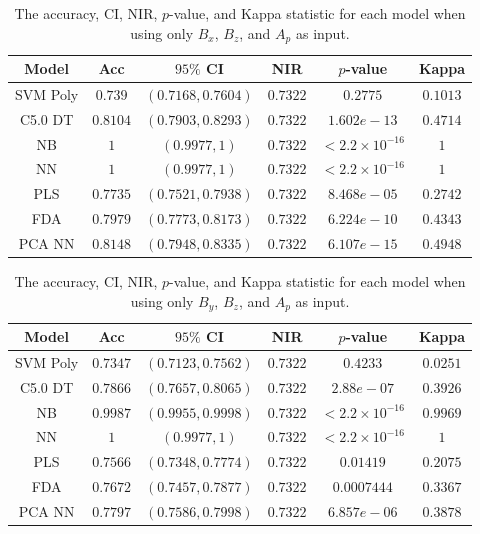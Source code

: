 \documentclass[sn-mathphys-num]{sn-jnl}%
\begin{document}
\begin{table}[!ht]
    \centering
    \caption{The accuracy, CI, NIR, $p$-value, and Kappa statistic for each model when using only $B_{x}$, $B_{z}$, and $A_{p}$ as input.}
	\label{tab:stats:reverse:xzap}
	\begin{tabular}{|c|c|c|c|c|c|}
		\hline
		Model & Acc & $95\%$ CI & NIR & $p$-value & Kappa \\ \hline
		SVM Poly & $0.739$ & $(0.7168, 0.7604)$ & $0.7322$ & $0.2775$ & $0.1013$ \\ \hline
		C5.0 DT & $0.8104$ & $(0.7903, 0.8293)$ & $0.7322$ & $1.602e-13$ & $0.4714$ \\ \hline
		NB & $1$ & $(0.9977, 1)$ & $0.7322$ & $< 2.2 \times {10}^{-16}$ & $1$ \\ \hline
		NN & $1$ & $(0.9977, 1)$ & $0.7322$ & $< 2.2 \times {10}^{-16}$ & $1$ \\ \hline
		PLS & $0.7735$ & $(0.7521, 0.7938)$ & $0.7322$ & $8.468e-05$ & $0.2742$ \\ \hline
		FDA & $0.7979$ & $(0.7773, 0.8173)$ & $0.7322$ & $6.224e-10$ & $0.4343$ \\ \hline
		PCA NN & $0.8148$ & $(0.7948, 0.8335)$ & $0.7322$ & $6.107e-15$ & $0.4948$ \\ \hline
	\end{tabular}
\end{table}

\begin{table}[!ht]
    \centering
    \caption{The accuracy, CI, NIR, $p$-value, and Kappa statistic for each model when using only $B_{y}$, $B_{z}$, and $A_{p}$ as input.}
	\label{tab:stats:reverse:yzap}
	\begin{tabular}{|c|c|c|c|c|c|}
		\hline
		Model & Acc & $95\%$ CI & NIR & $p$-value & Kappa \\ \hline
		SVM Poly & $0.7347$ & $(0.7123, 0.7562)$ & $0.7322$ & $0.4233$ & $0.0251$ \\ \hline
		C5.0 DT & $0.7866$ & $(0.7657, 0.8065)$ & $0.7322$ & $2.88e-07$ & $0.3926$ \\ \hline
		NB & $0.9987$ & $(0.9955, 0.9998)$ & $0.7322$ & $< 2.2 \times {10}^{-16}$ & $0.9969$ \\ \hline
		NN & $1$ & $(0.9977, 1)$ & $0.7322$ & $< 2.2 \times {10}^{-16}$ & $1$ \\ \hline
		PLS & $0.7566$ & $(0.7348, 0.7774)$ & $0.7322$ & $0.01419$ & $0.2075$ \\ \hline
		FDA & $0.7672$ & $(0.7457, 0.7877)$ & $0.7322$ & $0.0007444$ & $0.3367$ \\ \hline
		PCA NN & $0.7797$ & $(0.7586, 0.7998)$ & $0.7322$ & $6.857e-06$ & $0.3878$ \\ \hline
	\end{tabular}
\end{table}
\end{document}
